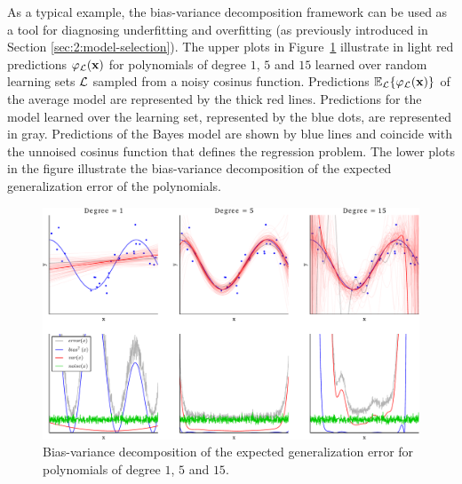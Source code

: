 As a typical example, the bias-variance decomposition framework can be used as
a tool for diagnosing underfitting and overfitting (as previously introduced in
Section \ref{sec:2:model-selection}). The upper plots in
Figure~\ref{fig:overfitting} illustrate in light red predictions $\varphi_{\cal
L}(\mathbf{x})$ for polynomials of degree $1$, $5$ and $15$ learned over random
learning sets ${\cal L}$ sampled from a noisy cosinus function. Predictions
$\mathbb{E}_{\cal L} \{ \varphi_{\cal L}(\mathbf{x}) \}$ of the average model
are represented by the thick red lines. Predictions for the model learned over
the learning set, represented by the blue dots, are represented in gray.
Predictions of the Bayes model are shown by blue lines and coincide with the unnoised
cosinus function that defines the regression problem. The lower plots in the
figure illustrate the bias-variance decomposition of the expected
generalization error of the polynomials.

\begin{figure}
    \hspace{-0.75cm}\includegraphics[width=1.1\textwidth]{figures/ch4_overfitting.pdf}
    \caption{Bias-variance decomposition of the expected generalization error for polynomials of degree $1$, $5$ and $15$.}
    \label{fig:overfitting}
\end{figure}

